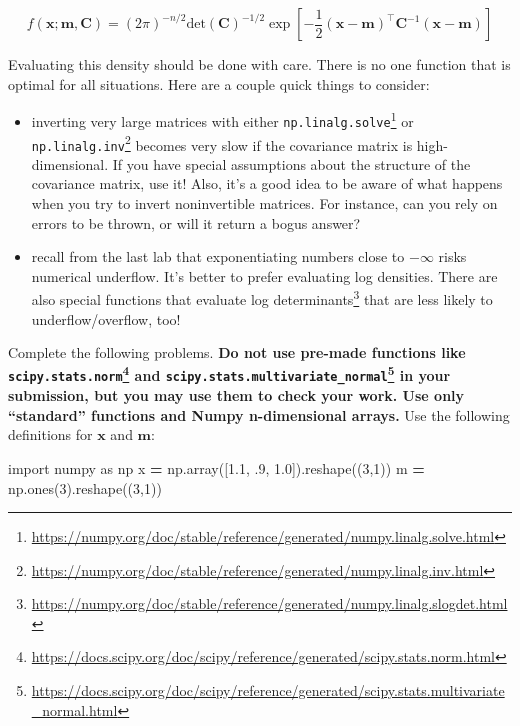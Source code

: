 \documentclass[
  12pt,
]{krantz}
\makeatletter
\newenvironment{Shaded}{\begin{snugshade}}{\end{snugshade}}
\newcommand{\DecValTok}[1]{\textcolor[rgb]{0.06,0.06,0.06}{#1}}
\newcommand{\FloatTok}[1]{\textcolor[rgb]{0.06,0.06,0.06}{#1}}
\newcommand{\ImportTok}[1]{#1}
\newcommand{\NormalTok}[1]{#1}
\newcommand{\OperatorTok}[1]{\textcolor[rgb]{0.43,0.43,0.43}{\textbf{#1}}}
\renewcommand{\href}[2]{#2\footnote{\url{#1}}}
\newenvironment{kframe}{%
\medskip{}
\setlength{\fboxsep}{.8em}
 \def\at@end@of@kframe{}%
 \ifinner\ifhmode%
  \def\at@end@of@kframe{\end{minipage}}%
  \begin{minipage}{\columnwidth}%
 \fi\fi%
 \def\FrameCommand##1{\hskip\@totalleftmargin \hskip-\fboxsep
 \colorbox{shadecolor}{##1}\hskip-\fboxsep
     \hskip-\linewidth \hskip-\@totalleftmargin \hskip\columnwidth}%
 \MakeFramed {\advance\hsize-\width
   \@totalleftmargin\z@ \linewidth\hsize
   \@setminipage}}%
 {\par\unskip\endMakeFramed%
 \at@end@of@kframe}
\renewenvironment{Shaded}{\begin{kframe}}{\end{kframe}}
\makeatother
\begin{document}
\[
f(\mathbf{x}; \mathbf{m}, \mathbf{C}) = (2\pi)^{-n/2}\text{det}\left( \mathbf{C} \right)^{-1/2}\exp\left[- \frac{1}{2} (\mathbf{x}- \mathbf{m})^\intercal \mathbf{C}^{-1} (\mathbf{x}- \mathbf{m}) \right]
\]

Evaluating this density should be done with care. There is no one function that is optimal for all situations. Here are a couple quick things to consider:

\begin{itemize}
\item
  inverting very large matrices with either \href{https://numpy.org/doc/stable/reference/generated/numpy.linalg.solve.html}{\texttt{np.linalg.solve}} or \href{https://numpy.org/doc/stable/reference/generated/numpy.linalg.inv.html}{\texttt{np.linalg.inv}} becomes very slow if the covariance matrix is high-dimensional. If you have special assumptions about the structure of the covariance matrix, use it! Also, it's a good idea to be aware of what happens when you try to invert noninvertible matrices. For instance, can you rely on errors to be thrown, or will it return a bogus answer?
\item
  recall from the last lab that exponentiating numbers close to \(-\infty\) risks numerical underflow. It's better to prefer evaluating log densities. There are also \href{https://numpy.org/doc/stable/reference/generated/numpy.linalg.slogdet.html}{special functions that evaluate log determinants} that are less likely to underflow/overflow, too!
\end{itemize}

Complete the following problems. \textbf{Do not use pre-made functions like \href{https://docs.scipy.org/doc/scipy/reference/generated/scipy.stats.norm.html}{\texttt{scipy.stats.norm}} and \href{https://docs.scipy.org/doc/scipy/reference/generated/scipy.stats.multivariate_normal.html}{\texttt{scipy.stats.multivariate\_normal}} in your submission, but you may use them to check your work. Use only ``standard'' functions and Numpy n-dimensional arrays.} Use the following definitions for \(\mathbf{x}\) and \(\mathbf{m}\):

\begin{Shaded}
\begin{Highlighting}[]
\ImportTok{import}\NormalTok{ numpy }\ImportTok{as}\NormalTok{ np}
\NormalTok{x }\OperatorTok{=}\NormalTok{ np.array([}\FloatTok{1.1}\NormalTok{, }\FloatTok{.9}\NormalTok{, }\FloatTok{1.0}\NormalTok{]).reshape((}\DecValTok{3}\NormalTok{,}\DecValTok{1}\NormalTok{))}
\NormalTok{m }\OperatorTok{=}\NormalTok{ np.ones(}\DecValTok{3}\NormalTok{).reshape((}\DecValTok{3}\NormalTok{,}\DecValTok{1}\NormalTok{))}
\end{Highlighting}
\end{Shaded}
\end{document}
